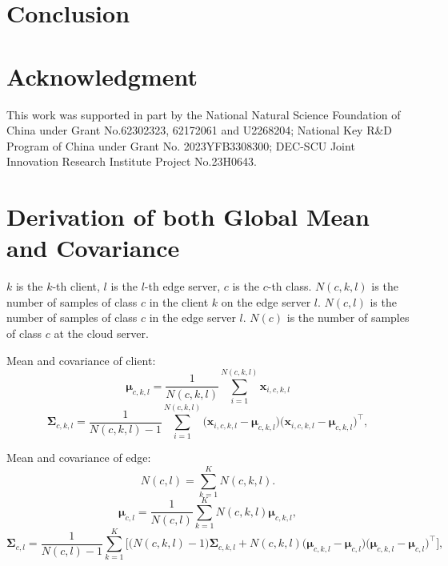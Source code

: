 \documentclass[journal]{IEEEtran}
\begin{document}



\section{Conclusion}


\section*{Acknowledgment}

This work was supported in part by the National Natural Science Foundation of China under Grant No.62302323, 62172061 and U2268204; National Key R\&D Program of China under Grant No. 2023YFB3308300; DEC-SCU Joint Innovation Research Institute Project No.23H0643.
 



\appendices
\onecolumn

\section{Derivation of both Global Mean and Covariance}
\(k\) is the \(k\)-th client, \(l\) is the \(l\)-th edge server, \(c\) is the \(c\)-th class. \( N(c,k,l) \) is the number of samples of class \( c \) in the client \( k \) on the edge server \( l \). \( N(c,l) \) is the number of samples of class \( c \) in the edge server \( l \). \( N(c) \) is the number of samples of class \( c \) at the cloud server.

Mean and covariance of client:
\begin{equation}
\mathbf{\mu}_{c,k,l} = \frac{1}{N(c,k,l)} \sum_{i=1}^{N(c,k,l)} \mathbf{x}_{i,c,k,l}
\end{equation}
\begin{equation}
\mathbf{\Sigma}_{c,k,l} = \frac{1}{N(c,k,l)-1} \sum_{i=1}^{N(c,k,l)} \big( \mathbf{x}_{i,c,k,l} - \mathbf{\mu}_{c,k,l} \big) \big( \mathbf{x}_{i,c,k,l} - \mathbf{\mu}_{c,k,l} \big)^\top,
\end{equation}

Mean and covariance of edge:
\begin{equation}
  N(c,l) = \sum_{k=1}^K N(c,k,l).
\end{equation}
\begin{equation}
    \mathbf{\mu}_{c,l} = \frac{1}{N(c,l)} \sum_{k=1}^K N(c,k,l) \mathbf{\mu}_{c,k,l},
    \end{equation}
\begin{equation}
\mathbf{\Sigma}_{c,l} = \frac{1}{N(c,l)-1} \sum_{k=1}^K \Bigg[
\big( N(c,k,l)-1 \big) \mathbf{\Sigma}_{c,k,l} + N(c,k,l) \big( \mathbf{\mu}_{c,k,l} - \mathbf{\mu}_{c,l} \big) \big( \mathbf{\mu}_{c,k,l} - \mathbf{\mu}_{c,l} \big)^\top
\Bigg],
\end{equation}
\end{document}
